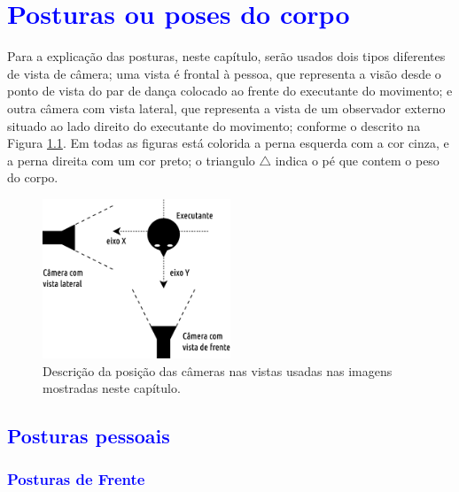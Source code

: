 \chapter{\textcolor{blue}{Posturas ou poses do corpo}}


Para a explicação das posturas, neste capítulo, serão usados dois tipos diferentes de vista de câmera;
uma vista é frontal à pessoa, 
que representa a visão desde o ponto de vista do par de dança colocado ao frente do executante do movimento; 
e outra câmera com vista lateral, 
que representa a vista de um observador externo situado ao lado direito do executante do movimento; 
conforme o descrito na Figura \ref{fig:vistacamera}.
Em todas as figuras está colorida a perna esquerda com a cor cinza, e a perna direita com um cor preto;
o triangulo $\triangle$ indica o pé que contem o peso do corpo.
\begin{figure}[h]
  \centering
    \includegraphics[width=0.5\textwidth]{chapters/cap-posturas/vistas.eps}
  \caption{Descrição da posição das câmeras nas vistas usadas nas imagens mostradas neste capítulo.}
  \label{fig:vistacamera}
\end{figure}


\section{\textcolor{blue}{Posturas pessoais}}



\subsection{\textcolor{blue}{ Posturas de Frente }}


